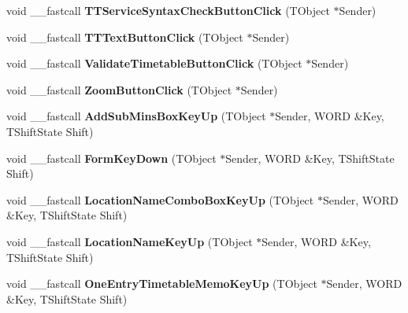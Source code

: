 \begin{DoxyCompactItemize}
\mbox{\label{class_t_interface_a003b10236c2b4316dc57be370c715c44}} 
void \+\_\+\+\_\+fastcall {\bfseries T\+T\+Service\+Syntax\+Check\+Button\+Click} (T\+Object $\ast$Sender)
\item 
\mbox{\label{class_t_interface_a37d4b92bd992fcaee2465a0f04becbee}} 
void \+\_\+\+\_\+fastcall {\bfseries T\+T\+Text\+Button\+Click} (T\+Object $\ast$Sender)
\item 
\mbox{\label{class_t_interface_a2f501868bbee2310af99bf2e8e265c59}} 
void \+\_\+\+\_\+fastcall {\bfseries Validate\+Timetable\+Button\+Click} (T\+Object $\ast$Sender)
\item 
\mbox{\label{class_t_interface_a08305797df7dfbdd16b3e8900c33e0bc}} 
void \+\_\+\+\_\+fastcall {\bfseries Zoom\+Button\+Click} (T\+Object $\ast$Sender)
\item 
\mbox{\label{class_t_interface_a0abab134f4994b02507e1e2d3f31cd77}} 
void \+\_\+\+\_\+fastcall {\bfseries Add\+Sub\+Mins\+Box\+Key\+Up} (T\+Object $\ast$Sender, W\+O\+RD \&Key, T\+Shift\+State Shift)
\item 
\mbox{\label{class_t_interface_acc63cfe8eb8e41508e32c7f7681e7e03}} 
void \+\_\+\+\_\+fastcall {\bfseries Form\+Key\+Down} (T\+Object $\ast$Sender, W\+O\+RD \&Key, T\+Shift\+State Shift)
\item 
\mbox{\label{class_t_interface_a212c7d3a2260f69a675c7053a31cad4b}} 
void \+\_\+\+\_\+fastcall {\bfseries Location\+Name\+Combo\+Box\+Key\+Up} (T\+Object $\ast$Sender, W\+O\+RD \&Key, T\+Shift\+State Shift)
\item 
\mbox{\label{class_t_interface_ac666c9f62cdb68b29c2a7db123a43a28}} 
void \+\_\+\+\_\+fastcall {\bfseries Location\+Name\+Key\+Up} (T\+Object $\ast$Sender, W\+O\+RD \&Key, T\+Shift\+State Shift)
\item 
\mbox{\label{class_t_interface_a8f417437f1683ddacce33c6e681571fc}} 
void \+\_\+\+\_\+fastcall {\bfseries One\+Entry\+Timetable\+Memo\+Key\+Up} (T\+Object $\ast$Sender, W\+O\+RD \&Key, T\+Shift\+State Shift)

\end{DoxyCompactItemize}
